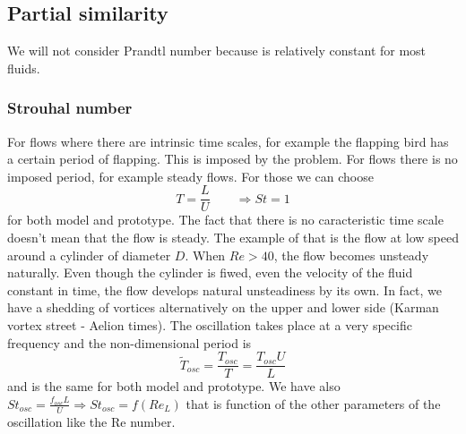  	\subsection{Partial similarity}
 		We will not consider Prandtl number because is relatively constant for most fluids. 
 			
 		\subsubsection{Strouhal number}
 			For flows where there are intrinsic time scales, for example the flapping bird has a certain period of flapping. This is imposed by the problem. For flows there is no imposed period, for example steady flows. For those we can choose 
 			\begin{equation}
 				T = \frac{L}{U} \qquad \Rightarrow St = 1
 			\end{equation}
 			for both model and prototype. The fact that there is no caracteristic time scale doesn't mean that the flow is steady. The example of that is the flow at low speed around a cylinder of diameter $D$. When $Re > 40$, the flow becomes unsteady naturally. Even though the cylinder is fiwed, even the velocity of the fluid constant in time, the flow develops natural unsteadiness by its own. In fact, we have a shedding of vortices alternatively on the upper and lower side (Karman vortex street - Aelion times). The oscillation takes place at a very specific frequency and the non-dimensional period is 
 			\begin{equation}
 				\tilde{T}_{osc} = \frac{T_{osc}}{T} = \frac{T_{osc}U}{L}
			\end{equation} 			  
			and is the same for both model and prototype. We have also $St_{osc} = \frac{f_{osc}L}{U} \Rightarrow St_{osc} = f(Re_L)$ that is function of the other parameters of the oscillation like the Re number. 
			
